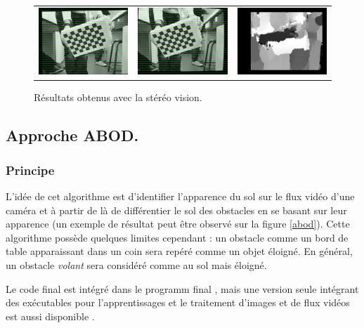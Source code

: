 \documentclass{article}
\begin{document}
\begin{figure}
\begin{center}
\begin{tabular}{ccc}
            \includegraphics[width=0.3\linewidth]{rcs/rem2l.png} & \includegraphics[width=0.3\linewidth]{rcs/rem2r.png} & \includegraphics[width=0.3\linewidth]{rcs/disp2.png} \\
        \end{tabular}
    \end{center}
    \caption{Résultats obtenus avec la stéréo vision.}
    \label{disp_result}
\end{figure}

\subsection{Approche ABOD.}
\subsubsection{Principe} L'idée de cet algorithme est d'identifier l'apparence du sol sur le flux vidéo d'une caméra et à partir de là de différentier le sol des obstacles en se basant sur leur apparence (un exemple de résultat peut être observé sur la figure \ref{abod}). Cette algorithme possède quelques limites cependant : un obstacle comme un bord de table apparaissant dans un coin sera repéré comme un objet éloigné. En général, un obstacle \emph{volant} sera considéré comme au sol mais éloigné.

Le code final est intégré dans le programm final \cite{ppefinal}, mais une version seule intégrant des exécutables pour l'apprentissages et le traitement d'images et de flux vidéos est aussi disponible \cite{ppeabod}.
\end{document}

